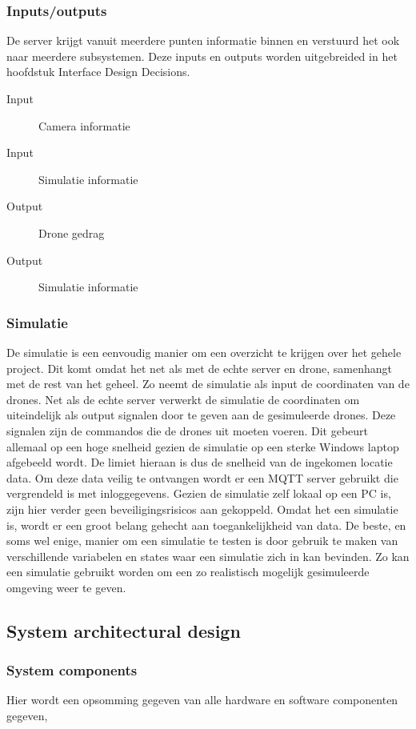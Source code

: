 \subsubsection*{Inputs/outputs}
De server krijgt vanuit meerdere punten informatie binnen en verstuurd het ook naar meerdere subsystemen.
Deze inputs en outputs worden uitgebreided in het hoofdstuk Interface Design Decisions.


\begin{description}
    \item[Input] Camera informatie
    \item[Input] Simulatie informatie
    \item[Output] Drone gedrag
    \item[Output] Simulatie informatie
\end{description}

\subsubsection{Simulatie}
De simulatie is een eenvoudig manier om een overzicht te krijgen over het gehele project. Dit komt omdat het net als met de echte server en drone, samenhangt met de rest van het geheel. Zo neemt de simulatie als input de coordinaten van de drones. Net als de echte server verwerkt de simulatie de coordinaten om uiteindelijk als output signalen door te geven aan de gesimuleerde drones. Deze signalen zijn de commandos die de drones uit moeten voeren. Dit gebeurt allemaal op een hoge snelheid gezien de simulatie op een sterke Windows laptop afgebeeld wordt. De limiet hieraan is dus de snelheid van de ingekomen locatie data. Om deze data veilig te ontvangen wordt er een MQTT server gebruikt die vergrendeld is met inloggegevens. Gezien de simulatie zelf lokaal op een PC is, zijn hier verder geen beveiligingsrisicos aan gekoppeld. Omdat het een simulatie is, wordt er een groot belang gehecht aan toegankelijkheid van data. De beste, en soms wel enige, manier om een simulatie te testen is door gebruik te maken van verschillende variabelen en states waar een simulatie zich in kan bevinden. Zo kan een simulatie gebruikt worden om een zo realistisch mogelijk gesimuleerde omgeving weer te geven.


\subsection{System architectural design}

\subsubsection{System components}
Hier wordt een opsomming gegeven van alle hardware en software componenten gegeven, 

